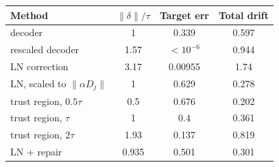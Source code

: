 \begin{tabular}{lccc}
\toprule
Method & $\|\delta\|/\tau$ & Target err & Total drift \\
\midrule
decoder & 1 & 0.339 & 0.597 \\
rescaled decoder & 1.57 & $<\!10^{-6}$ & 0.944 \\
LN correction & 3.17 & 0.00955 & 1.74 \\
LN, scaled to $\|\alpha D_j\|$ & 1 & 0.629 & 0.278 \\
trust region, $0.5\tau$ & 0.5 & 0.676 & 0.202 \\
trust region, $\tau$ & 1 & 0.4 & 0.361 \\
trust region, $2\tau$ & 1.93 & 0.137 & 0.819 \\
LN + repair & 0.935 & 0.501 & 0.301 \\
\bottomrule
\end{tabular}
